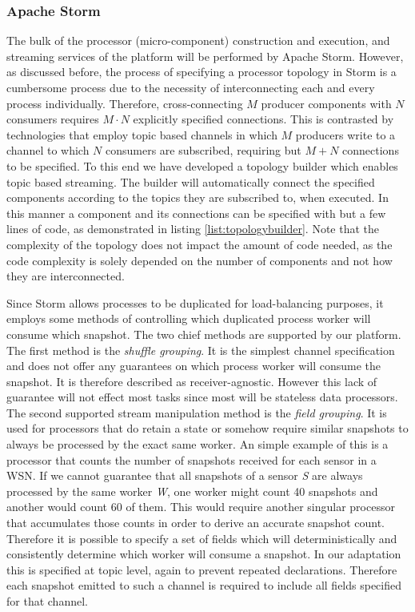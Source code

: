 \subsubsection*{Apache Storm}
The bulk of the processor (micro-component) construction and execution, and streaming services of the platform will be performed by Apache Storm. However, as discussed before, the process of specifying a processor topology in Storm is a cumbersome process due to the necessity of interconnecting each and every process individually. Therefore, cross-connecting $M$ producer components with $N$ consumers requires $M\cdot N$ explicitly specified connections. This is contrasted by technologies that employ topic based channels in which $M$ producers write to a channel to which $N$ consumers are subscribed, requiring but $M+N$ connections to be specified. To this end we have developed a topology builder which enables topic based streaming. The builder will automatically connect the specified components according to the topics they are subscribed to, when executed. In this manner a component and its connections can be specified with but a few lines of code, as demonstrated in listing \ref{list:topologybuilder}. Note that the complexity of the topology does not impact the amount of code needed, as the code complexity is solely depended on the number of components and not how they are interconnected.



Since Storm allows processes to be duplicated for load-balancing purposes, it employs some methods of controlling which duplicated process worker will consume which snapshot. The two chief methods are supported by our platform. The first method is the \emph{shuffle grouping}. It is the simplest channel specification and does not offer any guarantees on which process worker will consume the snapshot. It is therefore described as receiver-agnostic. However this lack of guarantee will not effect most tasks since most will be stateless data processors. The second supported stream manipulation method is the \emph{field grouping}. It is used for processors that do retain a state or somehow require similar snapshots to always be processed by the exact same worker. An simple example of this is a processor that counts the number of snapshots received for each sensor in a WSN. If we cannot guarantee that all snapshots of a sensor \emph{S} are always processed by the same worker \emph{W}, one worker might count 40 snapshots and another would count 60 of them. This would require another singular processor that accumulates those counts in order to derive an accurate snapshot count. Therefore it is possible to specify a set of fields which will deterministically and consistently determine which worker will consume a snapshot. In our adaptation this is specified at topic level, again to prevent repeated declarations. Therefore each snapshot emitted to such a channel is required to include all fields specified for that channel.

